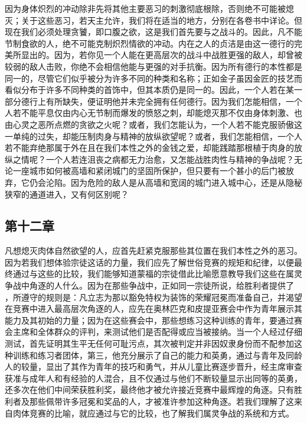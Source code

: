 因为身体炽烈的冲动除非先将其他主要恶习的刺激彻底根除，否则绝不可能被熄灭；关于这些恶习，若天主允许，我们将在适当的地方，分别在各卷书中详论。但现在我们必须处理贪饕，即口腹之欲，这是我们首先要与之战斗的。因此，凡不能节制食欲的人，绝不可能克制炽烈情欲的冲动。内在之人的贞洁是由这一德行的完美所显出的。因为，若你见一个人能在更高层次的战斗中战胜更强的敌人，却曾被较弱的敌人击败，你绝不会相信他能与更强的对手抗衡。因为所有德行的本性都是同一的，尽管它们似乎被分为许多不同的种类和名称；正如金子虽因金匠的技艺而看似分布于许多不同种类的首饰中，但其本质仍是同一的。因此，一个人若在某一部分德行上有所缺失，便证明他并未完全拥有任何德行。因为我们怎能相信，一个人若不能平息仅由内心无节制而爆发的愤怒之刺，却能熄灭那不仅由身体刺激、也由心灵之恶所点燃的贪欲之火呢？或者，我们怎能认为，一个人若不能克服骄傲这一单纯的过失，却能压制肉身与精神的放纵欲望呢？或者，我们怎能相信，一个人若不能弃绝那属于外在且在我们本性之外的金钱之爱，却能践踏那根植于肉身的放纵之情呢？一个人若连沮丧之病都无力治愈，又怎能战胜肉性与精神的争战呢？无论一座城市如何被高墙和紧闭城门的坚固所保护，但只要有一个甚小的后门被放弃，它仍会沦陷。因为危险的敌人是从高墙和宽阔的城门进入城中心，还是从隐秘狭窄的通道进入，又有何区别呢？\par


\subsection{第十二章}

\par

  凡想熄灭肉体自然欲望的人，应首先赶紧克服那些其位置在我们本性之外的恶习。因为若我们想体验宗徒这话的力量，我们应先了解世俗竞赛的规矩和纪律，以便最终通过与这些的比较，我们能够知道蒙福的宗徒借此比喻愿意教导我们这些在属灵争战中角逐的人什么。因为在那些争战中，正如同一宗徒所说，给胜利者提供了 ，所遵守的规则是：凡立志为那以豁免特权为装饰的荣耀冠冕而准备自己，并渴望在竞赛中进入最高层次角逐的人，应先在奥林匹克和皮提亚赛会中作为青年展示其能力及其初始的力量；因为在这些赛会中，那些想练习这种训练的青年，要通过赛会主席和全体群众的评判，来测试他们是否配得或应当被接纳。当一个人经过仔细测试，首先证明其生平无任何可耻污点，其次被判定并非因奴隶身份而不配参加这种训练和练习者团体，第三，他充分展示了自己的能力和英勇，通过与青年及同龄人的较量，显出了其作为青年的技巧和勇气，并从儿童比赛逐步晋升，经主席审查获准与成年人和有经验的人混合，且不仅通过与他们不断较量显示出同等的英勇，还多次在他们中间荣获胜利奖，最终他才被允许接近竞赛中最辉煌的角逐。只有胜利者及那些佩带许多冠冕和奖品的人，才被准许参加这种角逐。若我们理解了这来自肉体竞赛的比喻，就应通过与它的比较，也了解我们属灵争战的系统和方式。\par

